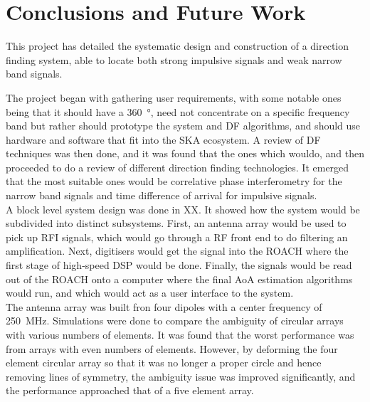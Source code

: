 \chapter{Conclusions and Future Work}
\label{ch:conclusions}
\graphicspath{{./img/conclusions/}}

This project has detailed the systematic design and construction of a direction finding system, able to locate both strong impulsive signals and weak narrow band signals. 

The project began with gathering user requirements, with some notable ones being that it should have a \SI{360}{\degree}, need not concentrate on a specific frequency band but rather should prototype the system and DF algorithms, and should use hardware and software that fit into the SKA ecosystem. A review of DF techniques was then done, and it was found that the ones which wouldo, and then proceeded to do a review of different direction finding technologies. It emerged that the most suitable ones would be correlative phase interferometry for the narrow band signals and time difference of arrival for impulsive signals.\\

A block level system design was done in XX. It showed how the system would be subdivided into distinct subsystems. First, an antenna array would be used to pick up RFI signals, which would go through a RF front end to do filtering an amplification. Next, digitisers would get the signal into the ROACH where the first stage of high-speed DSP would be done. Finally, the signals would be read out of the ROACH onto a computer where the final AoA estimation algorithms would run, and which would act as a user interface to the system.\\

The antenna array was built fron four dipoles with a center frequency of \SI{250}{\mega\hertz}. Simulations were done to compare the ambiguity of circular arrays with various numbers of elements. It was found that the worst performance was from arrays with even numbers of elements. However, by deforming the four element circular array so that it was no longer a proper circle and hence removing lines of symmetry, the ambiguity issue was improved significantly, and the performance approached that of a five element array.
